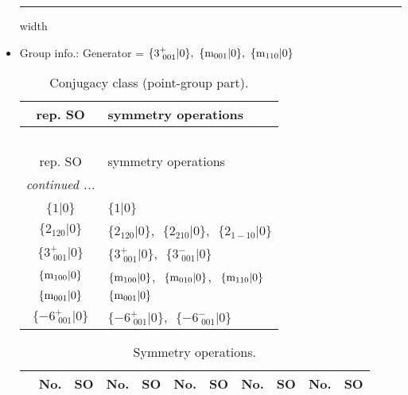 \documentclass[fleqn,10pt,landscape]{article}
\begin{document}
\begin{itemize}
 \hfil \hrule height 1mm width \textwidth \hfil

\item Group info.: Generator = $\{3^{+}_{\,\,001}|0\},\,\,\{{\rm m}_{001}|0\},\,\,\{{\rm m}_{110}|0\}$

\begin{center}
\renewcommand{\arraystretch}{1.3}
\begin{longtable}{c|l}
\caption{Conjugacy class (point-group part).}
 \\
 \hline \hline
rep. SO & symmetry operations \\ \hline \endfirsthead

\multicolumn{1}{l}{\tablename\ \thetable{}} \\
 \hline \hline
rep. SO & symmetry operations \\ \hline \endhead

 \hline \hline
\multicolumn{1}{r}{\footnotesize\it continued ...} \\ \endfoot

 \hline \hline
\multicolumn{1}{r}{} \\ \endlastfoot

$\{1|0\}$ & $\{1|0\}$ \\ \hline
$\{2{}_{120}|0\}$ & $\{2{}_{120}|0\}$,\,\, $\{2{}_{210}|0\}$,\,\, $\{2{}_{1-10}|0\}$ \\ \hline
$\{3^{+}_{\,\,001}|0\}$ & $\{3^{+}_{\,\,001}|0\}$,\,\, $\{3^{-}_{\,\,001}|0\}$ \\ \hline
$\{{\rm m}_{100}|0\}$ & $\{{\rm m}_{100}|0\}$,\,\, $\{{\rm m}_{010}|0\}$,\,\, $\{{\rm m}_{110}|0\}$ \\ \hline
$\{{\rm m}_{001}|0\}$ & $\{{\rm m}_{001}|0\}$ \\ \hline
$\{-6^{+}_{\,\,001}|0\}$ & $\{-6^{+}_{\,\,001}|0\}$,\,\, $\{-6^{-}_{\,\,001}|0\}$ \\
\end{longtable}
\end{center}
\begin{center}
\renewcommand{\arraystretch}{1.3}
\begin{longtable}{c|cc|cc|cc|cc|cc}
\caption{Symmetry operations.}
 \\
 \hline \hline
 & No. & SO & No. & SO & No. & SO & No. & SO & No. & SO \\ \hline \endfirsthead


\end{longtable}
\end{center}
\end{itemize}
\end{document}

